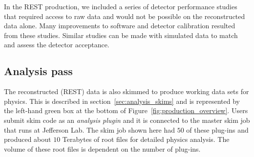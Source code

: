 In the REST production, we included a series of detector performance studies that required access to raw data and would not be possible on the reconstructed data alone. Many improvements to software and detector calibration resulted from these studies. Similar studies can be made with simulated data to match and assess the detector acceptance.


\subsection{Analysis pass \label{sec:recanalysis}}

The reconstructed (REST) data is also skimmed to produce working data sets for physics. This is described in section~\ref{sec:analysis_skims} and is represented by the left-hand
green box at the bottom of Figure~\ref{fig:production_overview}. Users submit skim code as an \emph{analysis plugin} and it is connected to the master skim job that runs at Jefferson Lab. The skim job shown here had $50$ of these plug-ins and produced about $10$ Terabytes of root files for detailed physics analysis. The volume of these root files is dependent on the number of plug-ins.

